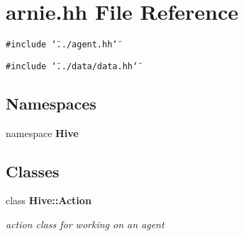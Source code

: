 \section{arnie.hh File Reference}
\label{arnie_8hh}


{\tt \#include \char`\"{}../agent.hh\char`\"{}}\par
{\tt \#include \char`\"{}../data/data.hh\char`\"{}}\par
\subsection*{Namespaces}
\begin{CompactItemize}
\item 
namespace {\bf Hive}
\end{CompactItemize}
\subsection*{Classes}
\begin{CompactItemize}
\item 
class {\bf Hive::Action}
\begin{CompactList}\small\item\em action class for working on an agent \item\end{CompactList}\end{CompactItemize}
